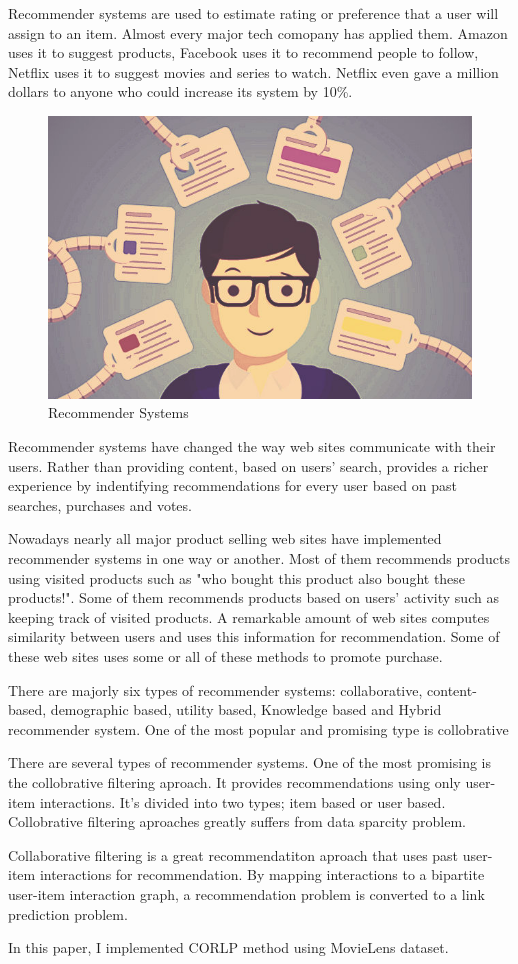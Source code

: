 Recommender systems are used to estimate rating or preference that a user will assign to an item. Almost every major tech comopany has applied them. Amazon uses it to suggest products, Facebook uses it to recommend people to follow, Netflix uses it to suggest movies and series to watch. Netflix even gave a million dollars to anyone who could increase its system by 10\%.

\begin{figure}[h!]
   \centering
   \includegraphics[width=0.8\linewidth]{images/recommender-systems.png}
   \caption{Recommender Systems~\cite{recommendersystem}}
   \label{fig:flowchart}
\end{figure}

Recommender systems have changed the way web sites communicate with their users. Rather than providing content, based on users' search, provides a richer experience by indentifying recommendations for every user based on past searches, purchases and votes.

Nowadays nearly all major product selling web sites have implemented recommender systems in one way or another. Most of them recommends products using visited products such as "who bought this product also bought these products!". Some of them recommends products based on users' activity such as keeping track of visited products. A remarkable amount of web sites computes similarity between users and uses this information for recommendation. Some of these web sites uses some or all of these methods to promote purchase.~\cite{jannach2010recommender}

There are majorly six types of recommender systems: collaborative, content-based, demographic based, utility based, Knowledge based and Hybrid recommender system. One of the most popular and promising type is collobrative

There are several types of recommender systems. One of the most promising is the collobrative filtering aproach. It provides recommendations using only user-item interactions. It's divided into two types; item based or user based.~\cite{xie2015link} Collobrative filtering aproaches greatly suffers from data sparcity problem.~\cite{chen2005link}

Collaborative filtering is a great recommendatiton aproach  that uses past user-item interactions for recommendation. By mapping interactions to a bipartite user-item interaction graph, a recommendation problem is converted to a link prediction problem.~\cite{xie2015link}

In this paper, I implemented \ac{CORLP} method using MovieLens dataset.